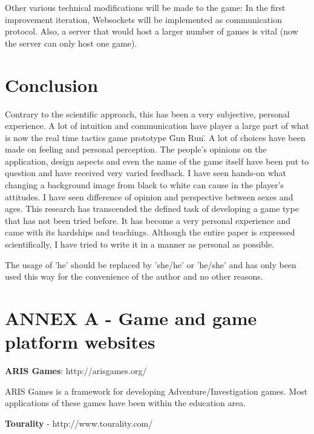 \documentclass{article}
\begin{document}
Other various technical modifications will be made to the game: In the first
improvement iteration, Websockets will be implemented as communication protocol.
Also, a server that would host a larger number of games is vital (now the
server can only host one game).



\section{Conclusion}

Contrary to the scientific approach, this has been a very subjective, personal
experience. A lot of intuition and communication have player a large part of
what is now the real time tactics game prototype \"Gun Run\". A lot of
choices have been made on feeling and personal perception. The people's opinions
on the application, design aspects and even the name of the game itself have
been put to question and have received very varied feedback. I have seen
hands-on what changing a background image from black to white can cause in the
player's attitudes. I have seen difference of opinion and perspective between
sexes and ages. This research has transcended the defined task of developing a
game type that has not been tried before. It has become a very personal
experience and came with its hardships and teachings. Although the entire paper
is expressed scientifically, I have tried to write it in a manner as personal as
possible.\newline

The usage of 'he' should be replaced by 'she/he' or 'he/she' and has only been
used this way for the convenience of the author and no other reasons.


\section{ANNEX A - Game and game platform websites}



\nocite{teamtags}
\nocite{gps1}



\textbf{ARIS Games}: http://arisgames.org/\newline

ARIS Games is a framework for developing Adventure/Investigation games. Most
applications of these games have been within the education area.\newline

\textbf{Tourality} - http://www.tourality.com/\newline
\end{document}
